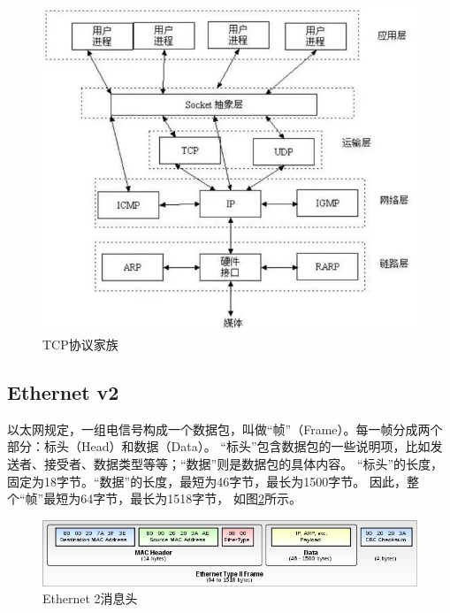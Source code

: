 \documentclass{book}
\begin{document}
\begin{figure}[htbp]
	\centering
	\includegraphics[scale=0.5]{TCPCommunicationBundle.jpg}
	\caption{TCP协议家族}
	\label{fig:TCPCommunicationBundle}
\end{figure}




\subsection{Ethernet v2}

以太网规定，一组电信号构成一个数据包，叫做“帧”（Frame）。每一帧分成两个部分：标头（Head）和数据（Data）。
“标头”包含数据包的一些说明项，比如发送者、接受者、数据类型等等；“数据”则是数据包的具体内容。
“标头”的长度，固定为18字节。“数据”的长度，最短为46字节，最长为1500字节。
因此，整个“帧”最短为64字节，最长为1518字节，
如图\ref{fig:700px-Ethernet_Type_II_Frame_format.svg}所示。

\begin{figure}[htbp]
	\centering
	\includegraphics[scale=0.5]{700px-Ethernet_Type_II_Frame_format.svg.png}
	\caption{Ethernet 2消息头}
	\label{fig:700px-Ethernet_Type_II_Frame_format.svg}
\end{figure}
\end{document}
